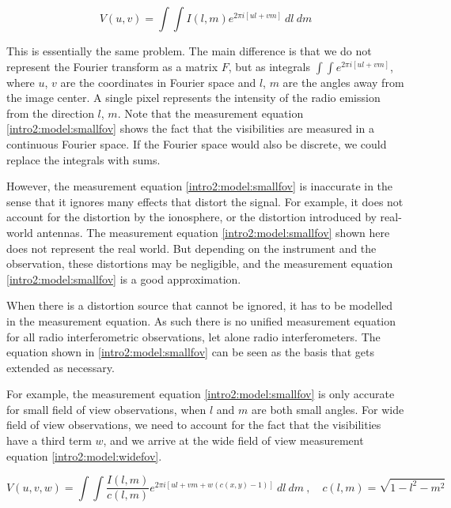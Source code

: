 \begin{equation}\label{intro2:model:smallfov}
V(u, v) = \int\int I(l, m)  e^{2 \pi i [ul+vm]} \: dl \: dm
\end{equation}

This is essentially the same problem. The main difference is that we do not represent the Fourier transform as a matrix $F$, but as integrals $\int\int e^{2 \pi i [ul+vm]}$, where $u$, $v$ are the coordinates in Fourier space and $l$, $m$ are the angles away from the image center. A single pixel represents the intensity of the radio emission from the direction $l$, $m$. Note that the measurement equation \eqref{intro2:model:smallfov} shows the fact that the visibilities are measured in a continuous Fourier space. If the Fourier space would also be discrete, we could replace the integrals with sums.

However, the measurement equation \eqref{intro2:model:smallfov} is inaccurate in the sense that it ignores many effects that distort the signal. For example, it does not account for the distortion by the ionosphere, or the distortion introduced by real-world antennas. The measurement equation \eqref{intro2:model:smallfov} shown here does not represent the real world. But depending on the instrument and the observation, these distortions may be negligible, and the measurement equation \eqref{intro2:model:smallfov} is a good approximation. 

When there is a distortion source that cannot be ignored, it has to be modelled in the measurement equation. As such there is no unified measurement equation for all radio interferometric observations, let alone radio interferometers. The equation shown in \eqref{intro2:model:smallfov} can be seen as the basis that gets extended as necessary\cite{smirnov2011revisiting1, smirnov2011revisiting2, smirnov2011revisiting3, smirnov2011revisiting4}.

For example, the measurement equation \eqref{intro2:model:smallfov} is only accurate for small field of view observations, when $l$ and $m$ are both small angles. For wide field of view observations, we need to account for the fact that the visibilities have a third term $w$, and we arrive at the wide field of view measurement equation \eqref{intro2:model:widefov}.
 
\begin{equation}\label{intro2:model:widefov}
 V(u, v, w) = \int\int  \frac{I(l, m)}{c(l, m)}  e^{2 \pi i [ul+vm+ w(c(x, y) - 1)]} \: dl \: dm \:,  \quad c(l,m) = \sqrt{1 - l^2 - m ^2}
\end{equation}
 
